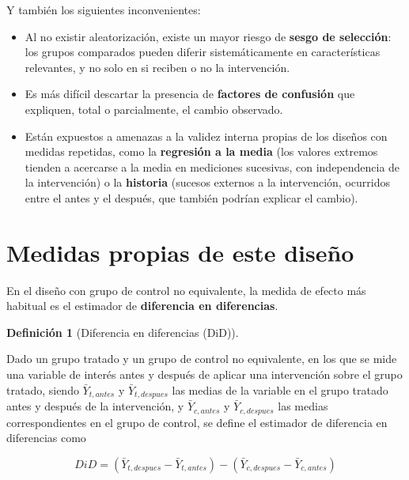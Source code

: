 \documentclass[
  spanish,
  a4paper,
]{scrreport}
\providecommand{\tightlist}{%
  \setlength{\itemsep}{0pt}\setlength{\parskip}{0pt}}
\theoremstyle{definition}
\theoremstyle{definition}
\newtheorem{definition}{Definición}[chapter]
\theoremstyle{remark}
\begin{document}
Y también los siguientes inconvenientes:

\begin{itemize}
\tightlist
\item
  Al no existir aleatorización, existe un mayor riesgo de \textbf{sesgo
  de selección}: los grupos comparados pueden diferir sistemáticamente
  en características relevantes, y no solo en si reciben o no la
  intervención.
\item
  Es más difícil descartar la presencia de \textbf{factores de
  confusión} que expliquen, total o parcialmente, el cambio observado.
\item
  Están expuestos a amenazas a la validez interna propias de los diseños
  con medidas repetidas, como la \textbf{regresión a la media} (los
  valores extremos tienden a acercarse a la media en mediciones
  sucesivas, con independencia de la intervención) o la
  \textbf{historia} (sucesos externos a la intervención, ocurridos entre
  el antes y el después, que también podrían explicar el cambio).
\end{itemize}

\section{Medidas propias de este
diseño}\label{medidas-propias-de-este-diseuxf1o-6}

En el diseño con grupo de control no equivalente, la medida de efecto
más habitual es el estimador de \textbf{diferencia en diferencias}.

\begin{definition}[Diferencia en diferencias
(DiD)]\protect\hypertarget{def-cuasiexperimentales-diferencia-en-diferencias}{}\label{def-cuasiexperimentales-diferencia-en-diferencias}

Dado un grupo tratado y un grupo de control no equivalente, en los que
se mide una variable de interés antes y después de aplicar una
intervención sobre el grupo tratado, siendo \(\bar{Y}_{t,antes}\) y
\(\bar{Y}_{t,despues}\) las medias de la variable en el grupo tratado
antes y después de la intervención, y \(\bar{Y}_{c,antes}\) y
\(\bar{Y}_{c,despues}\) las medias correspondientes en el grupo de
control, se define el estimador de diferencia en diferencias como

\[DiD = (\bar{Y}_{t,despues} - \bar{Y}_{t,antes}) - (\bar{Y}_{c,despues} - \bar{Y}_{c,antes})\]

\end{definition}
\end{document}
